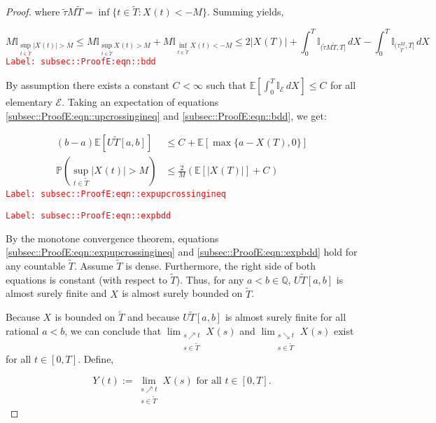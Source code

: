 \documentclass[12pt]{article}
\newcommand{\mb}{\mathbb}
\newcommand{\mc}{\mathcal}
\newcommand{\te}{\text}
\newcommand{\tr}{\textcolor{red}}
\newcommand{\labe}[1]{\tr{\texttt{Label: #1}}}
\newcommand{\ind}{\hspace{24pt}}
\newcommand{\pr}{\mb{P}}							%
\newcommand{\ex}[1]{\mb{E}\left[#1\right]}			%
\newcommand{\T}{T}								%
\renewcommand{\t}{t}							%
\renewcommand{\tt}{s}							%
\newcommand{\X}{X}								%
\newcommand{\cind}[1]{_{#1}}					%
\newcommand{\tp}[1]{(#1)}						%
\newcommand{\tip}[1]{#1}						%
\newcommand{\const}{C}							%
\newcommand{\alt}[1]{\widetilde{#1}}			%
\newcommand{\indx}[1]{_{#1}}					%
\newcommand{\XX}{Y}								%
\newcommand{\rt}{\tau}							%
\newcommand{\evnt}{\mc{E}}						%
\newcommand{\Tset}{\alt{T}}						%
\newcommand{\upcrs}{U}							%
\newcommand{\gid}[1]{^{#1}}						%
\newcommand{\gidd}[1]{_{#1}}					%
\begin{document}
\begin{proof}
where \(\alt{\rt}{M}{\Tset} = \inf\{\t\in \Tset: \X\cind{}\tp{\t} < -M\}\). Summing yields,

\begin{equation}
M\mb{I}_{\sup_{\t\in\Tset}|\X\cind{}\tp{\t}| > M} \leq M\mb{I}_{\sup_{\t\in\Tset}\X\cind{}\tp{\t} > M} + M\mb{I}_{\inf_{\t\in\Tset}\X\cind{}\tp{\t} < -M} \leq 2|\X\cind{}\tp{\T}| + \int_0^\T \mb{I}_{(\alt{\rt}{M}{\Tset},\T]}\,d\X\cind{}\tip{} - \int_0^\T \mb{I}_{(\rt\gid{M}\gidd{\Tset},\T]}\,d\X\cind{}\tip{}
\label{subsec::ProofE:eqn::bdd}
\end{equation}
\labe{subsec::ProofE:eqn::bdd}

By assumption there exists a constant \(\const\indx{} < \infty\) such that \(\ex{\int_0^\T \mb{I}_{\evnt}\,d\X\cind{}\tip{}} \leq \const\indx{}\) for all elementary \(\evnt\). Taking an expectation of equations \eqref{subsec::ProofE:eqn::upcrossingineq} and \eqref{subsec::ProofE:eqn::bdd}, we get:

\begin{align}
(b-a)\ex{\upcrs{\Tset}[a,b]} &\leq \const\indx{} + \ex{\max\{a-\X\cind{}\tp{\T},0\}}
\label{subsec::ProofE:eqn::expupcrossingineq}\\
\pr\left(\sup_{\t\in\Tset} |\X\cind{}\tp{\t}| > M\right) &\leq \frac{2}{M}\left(\ex{|\X\cind{}\tp{\T}|} + \const\indx{}\right)
\label{subsec::ProofE:eqn::expbdd}
\end{align}
\labe{subsec::ProofE:eqn::expupcrossingineq}

\labe{subsec::ProofE:eqn::expbdd}

By the monotone convergence theorem, equations \eqref{subsec::ProofE:eqn::expupcrossingineq} and \eqref{subsec::ProofE:eqn::expbdd} hold for any countable \(\Tset\). Assume \(\Tset\) is dense. Furthermore, the right side of both equations is constant (with respect to \(\Tset\)). Thus, for any \(a < b \in \mb{Q}\), \(\upcrs{\Tset}[a,b]\) is almost surely finite and \(\X\cind{}\tip{}\) is almost surely bounded on \(\Tset\).

\ind Because \(\X\cind{}\tip{}\) is bounded on \(\Tset\) and because \(\upcrs{\Tset}[a,b]\) is almost surely finite for all rational \(a < b\), we can conclude that \(\lim_{\substack{\tt \nearrow \t\\ \tt \in \Tset}} \X\cind{}\tp{\tt}\) and \(\lim_{\substack{\tt \searrow \t\\ \tt \in \Tset}} \X\cind{}\tp{\tt}\) exist for all \(\t \in [0,\T]\). Define,

\[\XX\cind{}\tp{\t} := \lim_{\substack{\tt \nearrow \t\\\tt \in \Tset}} \X\cind{}\tp{\tt}\te{ for all } \t \in [0,\T].\]


\end{proof}
\end{document}
